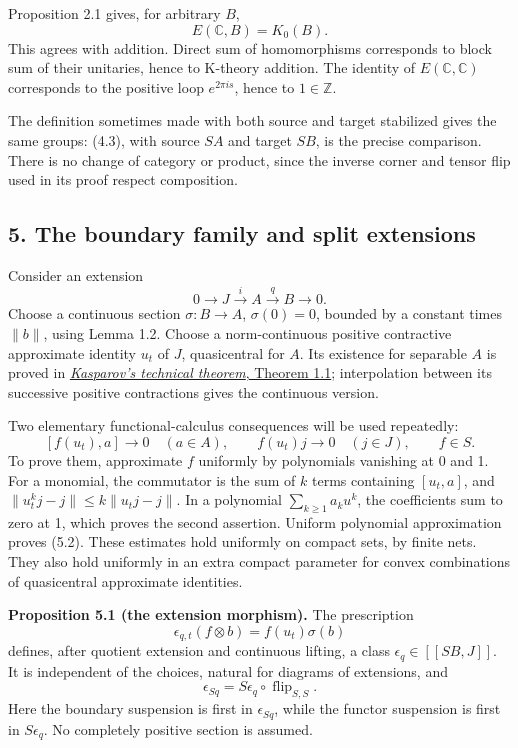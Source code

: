 \documentclass[
  11pt,
]{article}
\begin{document}
Proposition 2.1 gives, for arbitrary \(B\), \[
E(\mathbb C,B)=K_0(B).
\tag{4.7}
\] This agrees with addition. Direct sum of homomorphisms corresponds to
block sum of their unitaries, hence to K-theory addition. The identity
of \(E(\mathbb C,\mathbb C)\) corresponds to the positive loop
\(e^{2\pi is}\), hence to \(1\in\mathbb Z\).

The definition sometimes made with both source and target stabilized
gives the same groups: (4.3), with source \(SA\) and target \(SB\), is
the precise comparison. There is no change of category or product, since
the inverse corner and tensor flip used in its proof respect
composition.

\subsection{5. The boundary family and split
extensions}\label{the-boundary-family-and-split-extensions}

Consider an extension \[
0\longrightarrow J\xrightarrow{i}A\xrightarrow{q}B\longrightarrow0.
\tag{5.1}
\] Choose a continuous section \(\sigma:B\to A\), \(\sigma(0)=0\),
bounded by a constant times \(\|b\|\), using Lemma 1.2. Choose a
norm-continuous positive contractive approximate identity \(u_t\) of
\(J\), quasicentral for \(A\). Its existence for separable \(A\) is
proved in
\href{KT-KK-08.html\#1-approximate-identities-with-commutator-control}{\emph{Kasparov's
technical theorem}, Theorem 1.1}; interpolation between its successive
positive contractions gives the continuous version.

Two elementary functional-calculus consequences will be used repeatedly:
\[
[f(u_t),a]\longrightarrow0\quad(a\in A),\qquad
f(u_t)j\longrightarrow0\quad(j\in J),\qquad f\in S.
\tag{5.2}
\] To prove them, approximate \(f\) uniformly by polynomials vanishing
at 0 and 1. For a monomial, the commutator is the sum of \(k\) terms
containing \([u_t,a]\), and \(\|u_t^kj-j\|\leq k\|u_tj-j\|\). In a
polynomial \(\sum_{k\geq1}a_ku^k\), the coefficients sum to zero at 1,
which proves the second assertion. Uniform polynomial approximation
proves (5.2). These estimates hold uniformly on compact sets, by finite
nets. They also hold uniformly in an extra compact parameter for convex
combinations of quasicentral approximate identities.

\textbf{Proposition 5.1 (the extension morphism).} The prescription \[
\epsilon_{q,t}(f\otimes b)=f(u_t)\sigma(b)
\tag{5.3}
\] defines, after quotient extension and continuous lifting, a class
\(\epsilon_q\in[[SB,J]]\). It is independent of the choices, natural for
diagrams of extensions, and \[
\epsilon_{Sq}=S\epsilon_q\circ\operatorname{flip}_{S,S}.
\tag{5.4}
\] Here the boundary suspension is first in \(\epsilon_{Sq}\), while the
functor suspension is first in \(S\epsilon_q\). No completely positive
section is assumed.
\end{document}
